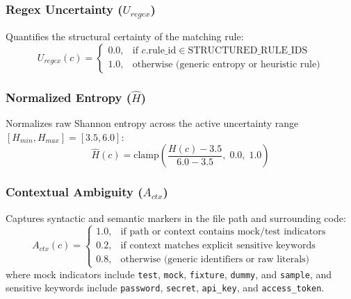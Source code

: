 \subsubsection{Regex Uncertainty ($U_{regex}$)}
Quantifies the structural certainty of the matching rule:
\begin{equation}
    U_{regex}(c) = \begin{cases}
    0.0, & \text{if } c.\text{rule\_id} \in \text{STRUCTURED\_RULE\_IDS} \\
    1.0, & \text{otherwise (generic entropy or heuristic rule)}
    \end{cases}
\end{equation}

\subsubsection{Normalized Entropy ($\hat{H}$)}
Normalizes raw Shannon entropy across the active uncertainty range $[H_{min}, H_{max}] = [3.5, 6.0]$:
\begin{equation}
    \hat{H}(c) = \text{clamp}\left( \frac{H(c) - 3.5}{6.0 - 3.5},\; 0.0,\; 1.0 \right)
\end{equation}

\subsubsection{Contextual Ambiguity ($A_{ctx}$)}
Captures syntactic and semantic markers in the file path and surrounding code:
\begin{equation}
    A_{ctx}(c) = \begin{cases}
    1.0, & \text{if path or context contains mock/test indicators} \\
    0.2, & \text{if context matches explicit sensitive keywords} \\
    0.8, & \text{otherwise (generic identifiers or raw literals)}
    \end{cases}
\end{equation}
where mock indicators include \texttt{test}, \texttt{mock}, \texttt{fixture}, \texttt{dummy}, and \texttt{sample}, and sensitive keywords include \texttt{password}, \texttt{secret}, \texttt{api\_key}, and \texttt{access\_token}.

